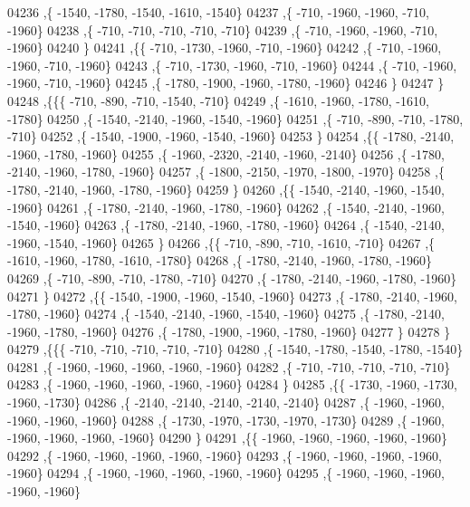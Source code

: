 \begin{DoxyCode}
04236     ,\{ -1540, -1780, -1540, -1610, -1540\}
04237     ,\{  -710, -1960, -1960,  -710, -1960\}
04238     ,\{  -710,  -710,  -710,  -710,  -710\}
04239     ,\{  -710, -1960, -1960,  -710, -1960\}
04240     \}
04241    ,\{\{  -710, -1730, -1960,  -710, -1960\}
04242     ,\{  -710, -1960, -1960,  -710, -1960\}
04243     ,\{  -710, -1730, -1960,  -710, -1960\}
04244     ,\{  -710, -1960, -1960,  -710, -1960\}
04245     ,\{ -1780, -1900, -1960, -1780, -1960\}
04246     \}
04247    \}
04248   ,\{\{\{  -710,  -890,  -710, -1540,  -710\}
04249     ,\{ -1610, -1960, -1780, -1610, -1780\}
04250     ,\{ -1540, -2140, -1960, -1540, -1960\}
04251     ,\{  -710,  -890,  -710, -1780,  -710\}
04252     ,\{ -1540, -1900, -1960, -1540, -1960\}
04253     \}
04254    ,\{\{ -1780, -2140, -1960, -1780, -1960\}
04255     ,\{ -1960, -2320, -2140, -1960, -2140\}
04256     ,\{ -1780, -2140, -1960, -1780, -1960\}
04257     ,\{ -1800, -2150, -1970, -1800, -1970\}
04258     ,\{ -1780, -2140, -1960, -1780, -1960\}
04259     \}
04260    ,\{\{ -1540, -2140, -1960, -1540, -1960\}
04261     ,\{ -1780, -2140, -1960, -1780, -1960\}
04262     ,\{ -1540, -2140, -1960, -1540, -1960\}
04263     ,\{ -1780, -2140, -1960, -1780, -1960\}
04264     ,\{ -1540, -2140, -1960, -1540, -1960\}
04265     \}
04266    ,\{\{  -710,  -890,  -710, -1610,  -710\}
04267     ,\{ -1610, -1960, -1780, -1610, -1780\}
04268     ,\{ -1780, -2140, -1960, -1780, -1960\}
04269     ,\{  -710,  -890,  -710, -1780,  -710\}
04270     ,\{ -1780, -2140, -1960, -1780, -1960\}
04271     \}
04272    ,\{\{ -1540, -1900, -1960, -1540, -1960\}
04273     ,\{ -1780, -2140, -1960, -1780, -1960\}
04274     ,\{ -1540, -2140, -1960, -1540, -1960\}
04275     ,\{ -1780, -2140, -1960, -1780, -1960\}
04276     ,\{ -1780, -1900, -1960, -1780, -1960\}
04277     \}
04278    \}
04279   ,\{\{\{  -710,  -710,  -710,  -710,  -710\}
04280     ,\{ -1540, -1780, -1540, -1780, -1540\}
04281     ,\{ -1960, -1960, -1960, -1960, -1960\}
04282     ,\{  -710,  -710,  -710,  -710,  -710\}
04283     ,\{ -1960, -1960, -1960, -1960, -1960\}
04284     \}
04285    ,\{\{ -1730, -1960, -1730, -1960, -1730\}
04286     ,\{ -2140, -2140, -2140, -2140, -2140\}
04287     ,\{ -1960, -1960, -1960, -1960, -1960\}
04288     ,\{ -1730, -1970, -1730, -1970, -1730\}
04289     ,\{ -1960, -1960, -1960, -1960, -1960\}
04290     \}
04291    ,\{\{ -1960, -1960, -1960, -1960, -1960\}
04292     ,\{ -1960, -1960, -1960, -1960, -1960\}
04293     ,\{ -1960, -1960, -1960, -1960, -1960\}
04294     ,\{ -1960, -1960, -1960, -1960, -1960\}
04295     ,\{ -1960, -1960, -1960, -1960, -1960\}

\end{DoxyCode}
